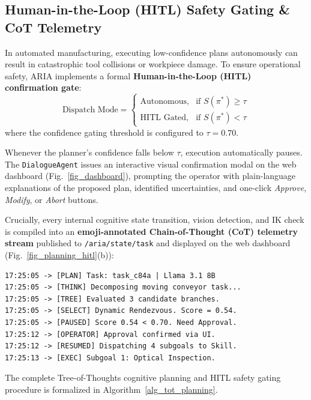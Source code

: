 \documentclass[journal]{IEEEtran}
\begin{document}
\subsection{Human-in-the-Loop (HITL) Safety Gating \& CoT Telemetry}
In automated manufacturing, executing low-confidence plans autonomously can result in catastrophic tool collisions or workpiece damage. To ensure operational safety, ARIA implements a formal \textbf{Human-in-the-Loop (HITL) confirmation gate}:
\begin{equation}
\text{Dispatch Mode} = \begin{cases}
\text{Autonomous}, & \text{if } S(\pi^*) \ge \tau \\
\text{HITL Gated}, & \text{if } S(\pi^*) < \tau
\end{cases}
\end{equation}
where the confidence gating threshold is configured to $\tau = 0.70$.

Whenever the planner's confidence falls below $\tau$, execution automatically pauses. The \texttt{DialogueAgent} issues an interactive visual confirmation modal on the web dashboard (Fig.~\ref{fig_dashboard}), prompting the operator with plain-language explanations of the proposed plan, identified uncertainties, and one-click \textit{Approve}, \textit{Modify}, or \textit{Abort} buttons.

Crucially, every internal cognitive state transition, vision detection, and IK check is compiled into an \textbf{emoji-annotated Chain-of-Thought (CoT) telemetry stream} published to \texttt{/aria/state/task} and displayed on the web dashboard (Fig.~\ref{fig_planning_hitl}(b)):
{\footnotesize
\begin{verbatim}
17:25:05 -> [PLAN] Task: task_c84a | Llama 3.1 8B
17:25:05 -> [THINK] Decomposing moving conveyor task...
17:25:05 -> [TREE] Evaluated 3 candidate branches.
17:25:05 -> [SELECT] Dynamic Rendezvous. Score = 0.54.
17:25:05 -> [PAUSED] Score 0.54 < 0.70. Need Approval.
17:25:12 -> [OPERATOR] Approval confirmed via UI.
17:25:12 -> [RESUMED] Dispatching 4 subgoals to Skill.
17:25:13 -> [EXEC] Subgoal 1: Optical Inspection.
\end{verbatim}
}

The complete Tree-of-Thoughts cognitive planning and HITL safety gating procedure is formalized in Algorithm~\ref{alg_tot_planning}.
\end{document}
